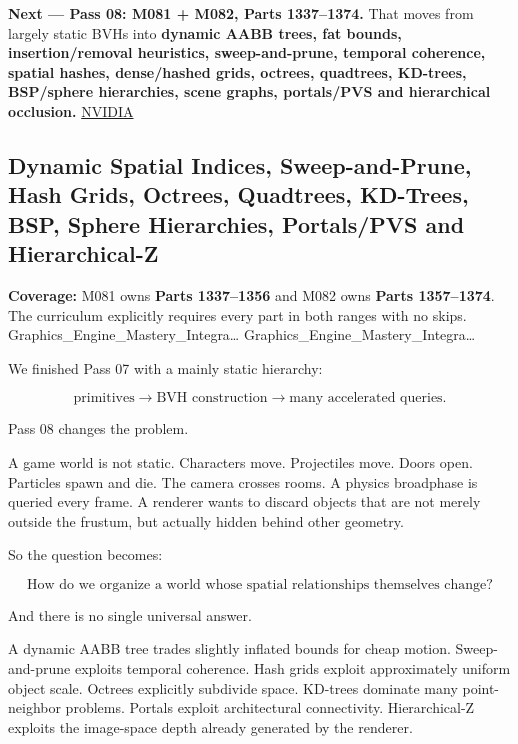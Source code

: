 \textbf{Next --- Pass 08: M081 + M082, Parts 1337--1374.} That moves from largely static BVHs into \textbf{dynamic AABB trees, fat bounds, insertion/removal heuristics, sweep-and-prune, temporal coherence, spatial hashes, dense/hashed grids, octrees, quadtrees, KD-trees, BSP/sphere hierarchies, scene graphs, portals/PVS and hierarchical occlusion.} \href{https://research.nvidia.com/publication/2012-06_maximizing-parallelism-construction-bvhs-octrees-and-k-d-trees?utm_source=chatgpt.com}{NVIDIA}

\subsection{Dynamic Spatial Indices, Sweep-and-Prune, Hash Grids, Octrees, Quadtrees, KD-Trees, BSP, Sphere Hierarchies, Portals/PVS and Hierarchical-Z}\label{06-engine-ii-ch028-dynamic-spatial-indices-sweep-and-prune-hash-grids-octrees-quadtrees-kd-trees-bsp-sphere-hierarchies-portalspvs-and-hierarchical-z}

\textbf{Coverage:} M081 owns \textbf{Parts 1337--1356} and M082 owns \textbf{Parts 1357--1374}. The curriculum explicitly requires every part in both ranges with no skips. Graphics\_Engine\_Mastery\_Integra\ldots{} Graphics\_Engine\_Mastery\_Integra\ldots{}

We finished Pass 07 with a mainly static hierarchy:

\[
\text{primitives}
\rightarrow
\text{BVH construction}
\rightarrow
\text{many accelerated queries}.
\]

Pass 08 changes the problem.

A game world is not static. Characters move. Projectiles move. Doors open. Particles spawn and die. The camera crosses rooms. A physics broadphase is queried every frame. A renderer wants to discard objects that are not merely outside the frustum, but actually hidden behind other geometry.

So the question becomes:

\[
\boxed{
\text{How do we organize a world whose spatial relationships themselves change?}
}
\]

And there is no single universal answer.

A dynamic AABB tree trades slightly inflated bounds for cheap motion. Sweep-and-prune exploits temporal coherence. Hash grids exploit approximately uniform object scale. Octrees explicitly subdivide space. KD-trees dominate many point-neighbor problems. Portals exploit architectural connectivity. Hierarchical-Z exploits the image-space depth already generated by the renderer.

